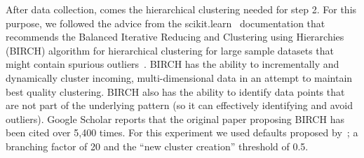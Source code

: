 \documentclass[10pt,journal,compsoc]{IEEEtran}
\begin{document}
 After data collection, comes  the  hierarchical clustering needed for step 2.
For this purpose, we followed the
advice from the scikit.learn~\cite{scikit-learn} documentation
that recommends the  Balanced Iterative Reducing and Clustering using Hierarchies  (BIRCH) algorithm for hierarchical
clustering for large sample datasets that might
contain spurious outliers~\cite{zhang1996birch}. 
BIRCH has the ability to incrementally and dynamically cluster incoming, multi-dimensional data in an attempt to maintain  best quality clustering. BIRCH also has the ability to identify data points that are not part of the underlying pattern (so it can effectively identifying and avoid outliers). 
 Google Scholar reports that  the original  paper proposing BIRCH has been cited over 5,400 times.
For this experiment we used defaults proposed by~\cite{zhang1996birch}; a   branching factor of 20 and  the ``new cluster creation'' threshold  of  0.5.

 
\end{document}
